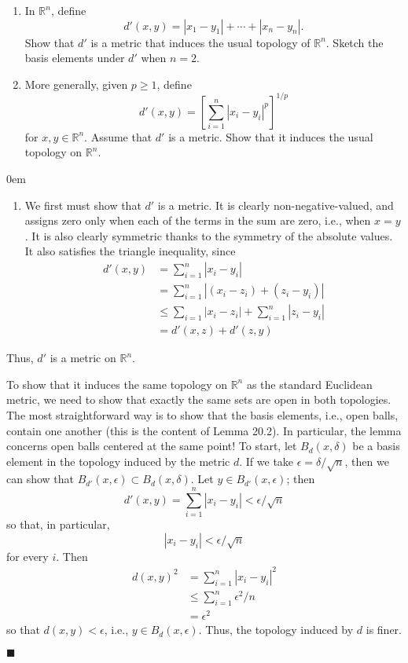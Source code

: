 \documentclass[12pt]{article}
\renewcommand{\qed}{\hfill$\blacksquare$}
\renewenvironment{proof}{\begin{addmargin}[1em]{0em}\begin{newproof}}{\end{newproof}\end{addmargin}\qed}
\newenvironment{problem}[2][Exercise]{\begin{trivlist}
\item[\hskip \labelsep {\bfseries #1}\hskip \labelsep {\bfseries #2.}]}{\end{trivlist}}
\begin{document}
\begin{problem}{20.1}
	\begin{enumerate}[label=(\alph*)]
		\item In $\mathbb{R}^n$, define $$ d'\left(x,y\right) = \left|x_1-y_1\right| + \cdots + \left|x_n-y_n\right|.$$ Show that $d'$ is a metric that induces the usual topology of $\mathbb{R}^n$. Sketch the basis elements under $d'$ when $n=2$.
		
		\item More generally, given $p\geq 1$, define $$d'\left(x,y\right) = \left[ \sum_{i=1}^n \left|x_i - y_i\right|^p \right]^{1/p} $$ for $x,y\in \mathbb{R}^n$. Assume that $d'$ is a metric. Show that it induces the usual topology on $\mathbb{R}^n$.
	\end{enumerate}
\end{problem}
\begin{proof}
	\begin{enumerate}[label=(\alph*)]
		\item We first must show that $d'$ is a metric. It is clearly non-negative-valued, and assigns zero only when each of the terms in the sum are zero, i.e., when $x=y$. It is also clearly symmetric thanks to the symmetry of the absolute values. It also satisfies the triangle inequality, since \begin{align*}
		d'\left(x,y\right) & = \sum_{i=1}^n \left|x_i - y_i\right| \\
		& = \sum_{i=1}^n \left|\left(x_i - z_i\right) + \left(z_i-y_i\right)\right| \\
		& \leq \sum_{i=1} \left|x_i - z_i\right| + \sum_{i=1}^n \left|z_i -y_i\right| \\ 
		& = d'\left(x,z\right) + d'\left(z,y\right)
		\end{align*}
	\end{enumerate}
	Thus, $d'$ is a metric on $\mathbb{R}^n$.
	
	To show that it induces the same topology on $\mathbb{R}^n$ as the standard Euclidean metric, we need to show that exactly the same sets are open in both topologies. The most straightforward way is to show that the basis elements, i.e., open balls, contain one another (this is the content of Lemma 20.2). {\color{red}In particular, the lemma concerns open balls centered at the same point!} To start, let $B_{d}\left(x,\delta\right)$ be a basis element in the topology induced by the metric $d$. If we take $\epsilon = \delta / \sqrt{n}$, then we can show that $B_{d'}\left(x,\epsilon\right) \subset B_{d}\left(x,\delta\right)$. Let $y \in B_{d'}\left(x,\epsilon\right)$; then $$ d'\left(x,y\right) = \sum_{i=1}^n \left|x_i - y_i \right| < \epsilon/\sqrt{n} $$ so that, in particular, $$ \left|x_i - y_i\right| < \epsilon/\sqrt{n}$$ for every $i$. Then \begin{align*}
	d\left(x,y\right)^2 & = \sum_{i=1}^n \left|x_i - y_i\right|^2\\
	& \leq \sum_{i=1}^n \epsilon^2 / n \\
	& = \epsilon^2
	\end{align*}
	so that $d\left(x,y\right) < \epsilon$, i.e., $y \in B_{d}\left(x,\epsilon\right)$. Thus, the topology induced by $d$ is finer. 
	

\end{proof}
\end{document}
